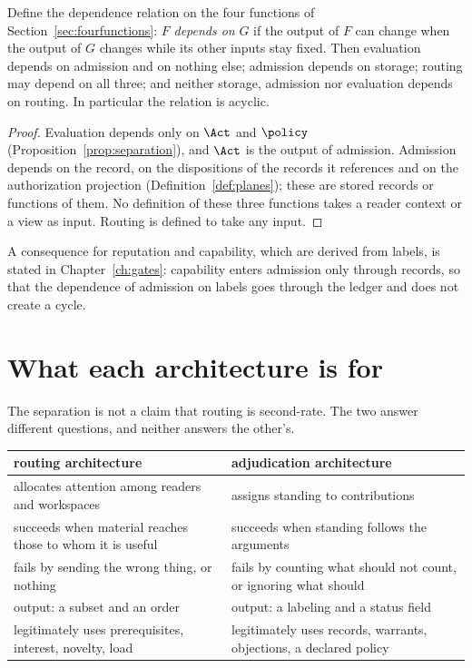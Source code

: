 \begin{proposition}\label{prop:oneway}
Define the dependence relation on the four functions of Section~\ref{sec:fourfunctions}: $F$ \emph{depends on} $G$ if the output of $F$ can change when the output of $G$ changes while its other inputs stay fixed. Then evaluation depends on admission and on nothing else; admission depends on storage; routing may depend on all three; and neither storage, admission nor evaluation depends on routing. In particular the relation is acyclic.
\end{proposition}

\begin{proof}
Evaluation depends only on $\Act$ and $\policy$ (Proposition~\ref{prop:separation}), and $\Act$ is the output of admission. Admission depends on the record, on the dispositions of the records it references and on the authorization projection (Definition~\ref{def:planes}); these are stored records or functions of them. No definition of these three functions takes a reader context or a view as input. Routing is defined to take any input.
\end{proof}

A consequence for reputation and capability, which are derived from labels, is stated in Chapter~\ref{ch:gates}: capability enters admission only through records, so that the dependence of admission on labels goes through the ledger and does not create a cycle.

\section{What each architecture is for}\label{sec:archfor}

The separation is not a claim that routing is second-rate. The two answer different questions, and neither answers the other's.

\begin{center}
\small
\begin{tabularx}{\textwidth}{@{}X X@{}}
\toprule
routing architecture & adjudication architecture\\
\midrule
allocates attention among readers and workspaces & assigns standing to contributions\\
succeeds when material reaches those to whom it is useful & succeeds when standing follows the arguments\\
fails by sending the wrong thing, or nothing & fails by counting what should not count, or ignoring what should\\
output: a subset and an order & output: a labeling and a status field\\
legitimately uses prerequisites, interest, novelty, load & legitimately uses records, warrants, objections, a declared policy\\
\bottomrule
\end{tabularx}
\end{center}

